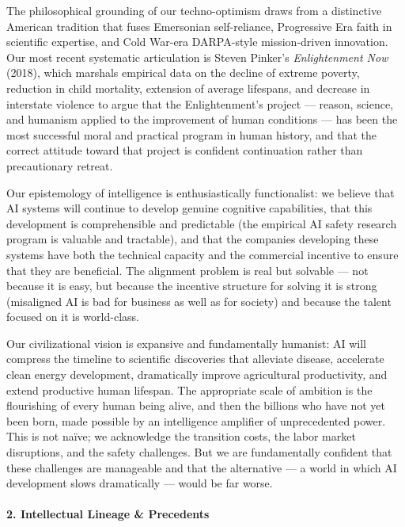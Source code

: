 The philosophical grounding of our techno-optimism draws from a
distinctive American tradition that fuses Emersonian self-reliance,
Progressive Era faith in scientific expertise, and Cold War-era
DARPA-style mission-driven innovation. Our most recent systematic
articulation is Steven Pinker's \emph{Enlightenment Now} (2018), which
marshals empirical data on the decline of extreme poverty, reduction in
child mortality, extension of average lifespans, and decrease in
interstate violence to argue that the Enlightenment's project ---
reason, science, and humanism applied to the improvement of human
conditions --- has been the most successful moral and practical program
in human history, and that the correct attitude toward that project is
confident continuation rather than precautionary retreat.

Our epistemology of intelligence is enthusiastically functionalist: we
believe that AI systems will continue to develop genuine cognitive
capabilities, that this development is comprehensible and predictable
(the empirical AI safety research program is valuable and tractable),
and that the companies developing these systems have both the technical
capacity and the commercial incentive to ensure that they are
beneficial. The alignment problem is real but solvable --- not because
it is easy, but because the incentive structure for solving it is strong
(misaligned AI is bad for business as well as for society) and because
the talent focused on it is world-class.

Our civilizational vision is expansive and fundamentally humanist: AI
will compress the timeline to scientific discoveries that alleviate
disease, accelerate clean energy development, dramatically improve
agricultural productivity, and extend productive human lifespan. The
appropriate scale of ambition is the flourishing of every human being
alive, and then the billions who have not yet been born, made possible
by an intelligence amplifier of unprecedented power. This is not naïve;
we acknowledge the transition costs, the labor market disruptions, and
the safety challenges. But we are fundamentally confident that these
challenges are manageable and that the alternative --- a world in which
AI development slows dramatically --- would be far worse.

\paragraph{2. Intellectual Lineage \&
Precedents}\label{intellectual-lineage-precedents-14}


